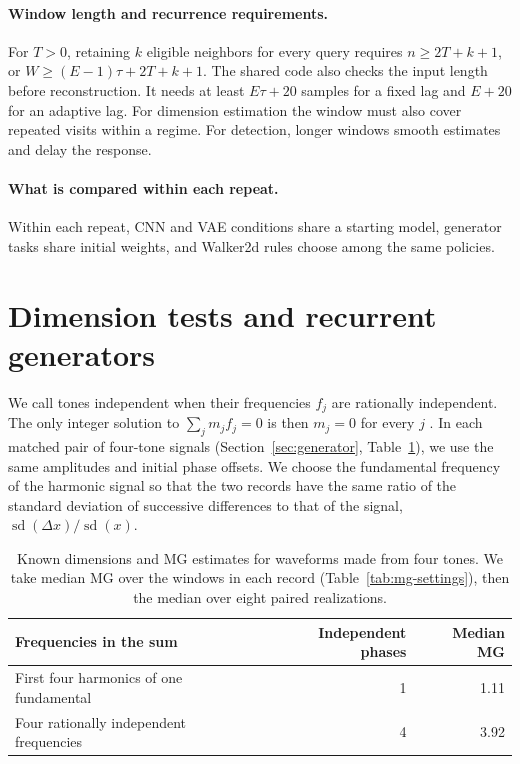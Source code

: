 {\paragraph{Window length and recurrence requirements.}
For $T>0$, retaining $k$ eligible neighbors for every query requires $n\ge 2T+k+1$, or $W\ge(E-1)\tau+2T+k+1$. The shared code also checks the input length before reconstruction. It needs at least $E\tau+20$ samples for a fixed lag and $E+20$ for an adaptive lag. For dimension estimation the window must also cover repeated visits within a regime. For detection, longer windows smooth estimates and delay the response.

\paragraph{What is compared within each repeat.}
Within each repeat, CNN and VAE conditions share a starting model, generator tasks share initial weights, and Walker2d rules choose among the same policies. 

\section[Dimension tests and recurrent generators]{Dimension tests and recurrent generators}\label{app:controlled}
We call tones independent when their frequencies $f_j$ are rationally independent. The only integer solution to $\sum_j m_j f_j=0$ is then $m_j=0$ for every $j$ \citep{teschl2012ordinary}.
In each matched pair of four-tone signals (Section~\ref{sec:generator}, Table~\ref{tab:tone-sums}), we use the same amplitudes and initial phase offsets. We choose the fundamental frequency of the harmonic signal so that the two records have the same ratio of the standard deviation of successive differences to that of the signal, $\operatorname{sd}(\Delta x)/\operatorname{sd}(x)$.

\begin{table}[htbp]
\centering\small
\caption{Known dimensions and MG estimates for waveforms made from four tones. We take median MG over the windows in each record (Table~\ref{tab:mg-settings}), then the median over eight paired realizations.}
\label{tab:tone-sums}
\begin{tabular}{@{}lrr@{}}
\toprule
Frequencies in the sum & Independent phases & Median MG \\
\midrule
First four harmonics of one fundamental & 1 & 1.11 \\
Four rationally independent frequencies & 4 & 3.92 \\
\bottomrule
\end{tabular}
\end{table}

}
